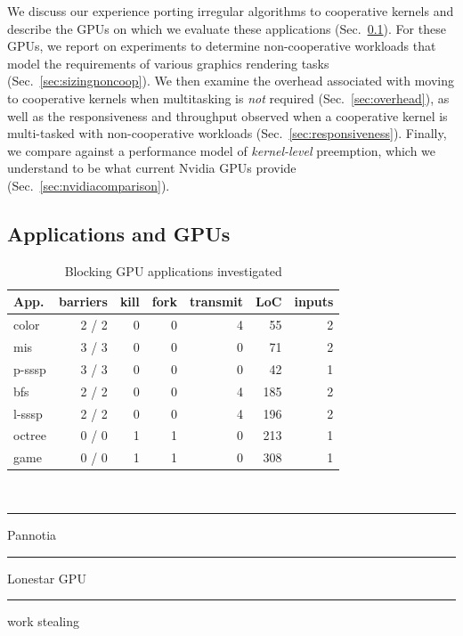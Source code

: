 \documentclass[sigconf]{acmart}
\newcommand\crule[3][black]{\textcolor{#1}{\rule{#2}{#3}}}
\newcommand{\mysec}{Sec.~}
\newcommand{\nvidia}{Nvidia\xspace}
\begin{document}
{We discuss our experience porting irregular algorithms to cooperative
kernels and describe the GPUs on which we evaluate these applications
(\mysec\ref{sec:portingalgorithms}).  For these GPUs, we report on
experiments to determine non-cooperative workloads that model the
requirements of various graphics rendering tasks
(\mysec\ref{sec:sizingnoncoop}).  We then examine the overhead
associated with moving to cooperative kernels when multitasking is
\emph{not} required (\mysec\ref{sec:overhead}), as well as the
responsiveness and throughput observed when a cooperative kernel is
multi-tasked with non-cooperative workloads
(\mysec\ref{sec:responsiveness}). Finally, we compare
against a performance model of \emph{kernel-level} preemption, which
we understand to be what current Nvidia GPUs provide (\mysec\ref{sec:nvidiacomparison}).



\subsection{Applications and GPUs}\label{sec:portingalgorithms}

\begin{table}[t]
\normalsize
\caption{Blocking GPU applications investigated}
\centering
\begin{tabular}{ l r r r r r r}
App. & barriers & kill & fork & transmit & LoC & inputs\\
\hline
\rowcolor{Gray1}
color & 2 / 2 & 0 & 0 & 4 & 55 & 2\\
\rowcolor{Gray1}
mis & 3 / 3 & 0 & 0 & 0 & 71 & 2\\
\rowcolor{Gray1}
p-sssp & 3 / 3 & 0 & 0 & 0  & 42 & 1\\
\rowcolor{Gray2}
bfs & 2 / 2 & 0 & 0  & 4  & 185 & 2\\
\rowcolor{Gray2}
l-sssp & 2 / 2 & 0 & 0  & 4  & 196 & 2\\
\rowcolor{Gray3}
octree & 0 / 0 & 1 & 1 & 0 & 213 & 1 \\
\rowcolor{Gray3}
game & 0 / 0 & 1 & 1 & 0 & 308 & 1 \\
\end{tabular} \\
\crule[Gray1]{.2cm}{.2cm} Pannotia \hspace{.4cm} \crule[Gray2]{.2cm}{.2cm} Lonestar GPU  \hspace{.4cm}  \crule[Gray3]{.2cm}{.2cm} work stealing


\end{table}}
\end{document}
